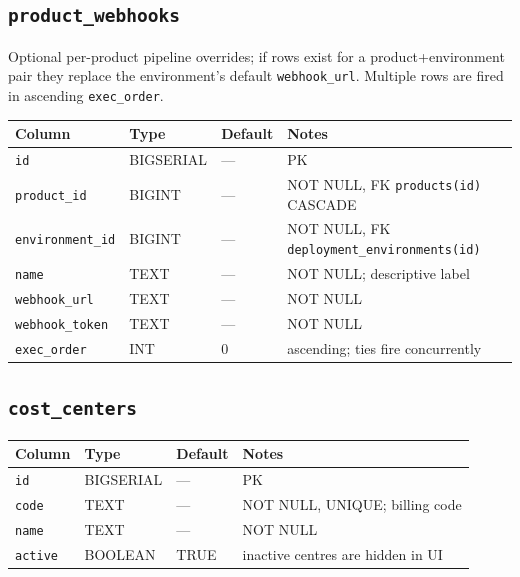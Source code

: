 \documentclass[12pt,a4paper,twoside]{report}
\newcommand{\code}[1]{\texttt{#1}}
\begin{document}
\subsection*{\texttt{product\_webhooks}}

Optional per-product pipeline overrides; if rows exist for a
product+environment pair they replace the environment's default
\code{webhook\_url}.  Multiple rows are fired in ascending
\code{exec\_order}.

\begin{table}[H]
  \centering\small
  \begin{tabular}{@{}llll@{}}
    \toprule
    \textbf{Column} & \textbf{Type} & \textbf{Default} & \textbf{Notes} \\
    \midrule
    \code{id}             & BIGSERIAL & ---       & PK \\
    \code{product\_id}    & BIGINT    & ---       & NOT NULL, FK \textrightarrow{} \code{products(id)} CASCADE \\
    \code{environment\_id}& BIGINT    & ---       & NOT NULL, FK \textrightarrow{} \code{deployment\_environments(id)} \\
    \code{name}           & TEXT      & ---       & NOT NULL; descriptive label \\
    \code{webhook\_url}   & TEXT      & ---       & NOT NULL \\
    \code{webhook\_token} & TEXT      & ---       & NOT NULL \\
    \code{exec\_order}    & INT       & 0         & ascending; ties fire concurrently \\
    \bottomrule
  \end{tabular}
\end{table}

\subsection*{\texttt{cost\_centers}}

\begin{table}[H]
  \centering\small
  \begin{tabular}{@{}llll@{}}
    \toprule
    \textbf{Column} & \textbf{Type} & \textbf{Default} & \textbf{Notes} \\
    \midrule
    \code{id}    & BIGSERIAL & ---  & PK \\
    \code{code}  & TEXT      & ---  & NOT NULL, UNIQUE; billing code \\
    \code{name}  & TEXT      & ---  & NOT NULL \\
    \code{active}& BOOLEAN   & TRUE & inactive centres are hidden in UI \\
    \bottomrule
  \end{tabular}
\end{table}
\end{document}
